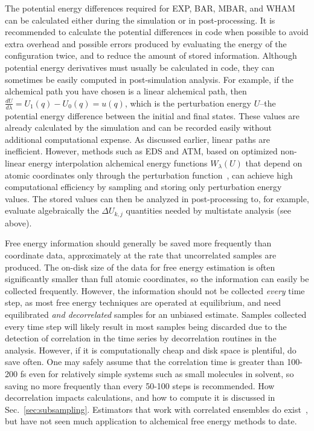 The potential energy differences required for EXP, BAR, MBAR, and WHAM can be calculated either during the simulation or in post-processing. It is recommended to calculate the potential differences in code when possible to avoid extra overhead and possible errors produced by evaluating the energy of the configuration twice, and to reduce the amount of stored information. 
Although potential energy derivatives must usually be calculated in code, they can sometimes be easily computed in post-simulation analysis. 
For example, if the alchemical path you have chosen is a linear alchemical path, then $\frac{dU}{d\lambda} = U_1(q) - U_0(q) = u(q)$, which is the perturbation energy $U$--the potential energy difference between the initial and final states. These values are already calculated by the simulation and can be recorded easily without additional computational expense. As discussed earlier, linear paths are inefficient. However, methods such as EDS and ATM, based on optimized non-linear energy interpolation alchemical energy functions $W_\lambda(U)$ that depend on atomic coordinates only through the perturbation function~\cite{konig2021efficient,azimi2022relative}, can achieve high computational efficiency by sampling and storing only perturbation energy values. The stored values can then be analyzed in post-processing to, for example, evaluate algebraically the $\Delta U_{k,j}$ quantities needed by multistate analysis (see above). 

Free energy information should generally be saved more frequently than coordinate data, approximately at the rate that uncorrelated samples are produced.  
The on-disk size of the data for free energy estimation is often significantly smaller than full atomic coordinates, so the information can easily be collected frequently. 
However, the information should not be collected \textit{every} time step, as most free energy techniques are operated at equilibrium, and need equilibrated \textit{and decorrelated} samples for an unbiased estimate.
Samples collected every time step will likely result in most samples being discarded due to the detection of correlation in the time series by decorrelation routines in the analysis. However, if it is computationally cheap and disk space is plentiful, do save often. One may safely assume that the correlation time is greater than 100-200 fs even for relatively simple systems such as small molecules in solvent, so saving no more frequently than every 50-100 steps is recommended. 
How decorrelation impacts calculations, and how to compute it is discussed in Sec.~\ref{sec:subsampling}. Estimators that work with correlated ensembles do exist~\cite{mey2014xtram,wu2014statistically,wu2016multiensemble}, but have not seen much application to alchemical free energy methods to date. 



